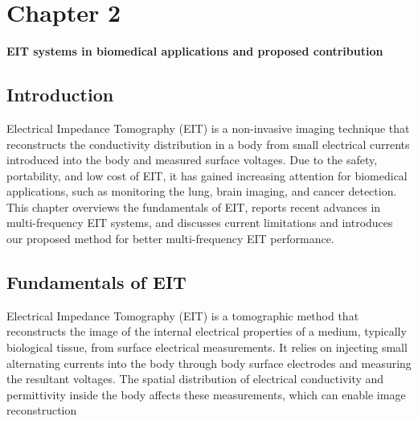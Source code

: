 \chapter*{Chapter 2}

\textbf {\Huge EIT systems in biomedical applications and proposed contribution} \\ 

\setcounter{chapter}{2}
\setcounter{section}{0}

\section{Introduction}
Electrical Impedance Tomography (EIT) is a non-invasive imaging technique that reconstructs the conductivity distribution in a body from small electrical currents introduced into the body and measured surface voltages. Due to the safety, portability, and low cost of EIT, it has gained increasing attention for biomedical applications, such as monitoring the lung, brain imaging, and cancer detection. This chapter overviews the fundamentals of EIT, reports recent advances in multi-frequency EIT systems, and discusses current limitations
and introduces our proposed method for better multi-frequency EIT performance.


\section{Fundamentals of EIT}
Electrical Impedance Tomography (EIT) is a tomographic method that reconstructs the
image of the internal electrical properties of a medium, typically biological tissue, from surface
electrical measurements. It relies on injecting small alternating currents into the body through
body surface electrodes and measuring the resultant voltages. The spatial distribution of
electrical conductivity and permittivity inside the body affects
these measurements, which can enable image reconstruction\cite{WikipediaEIT}
